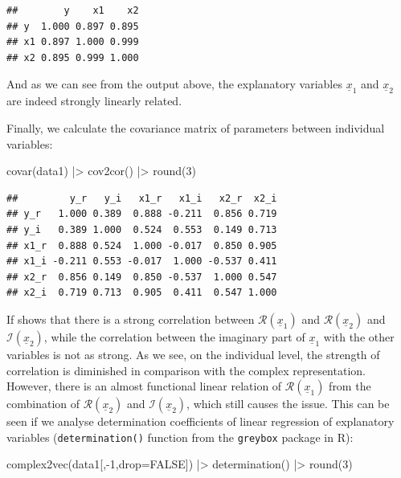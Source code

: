 \documentclass[
]{book}
\newenvironment{Shaded}{\begin{snugshade}}{\end{snugshade}}
\newcommand{\AttributeTok}[1]{\textcolor[rgb]{0.77,0.63,0.00}{#1}}
\newcommand{\ConstantTok}[1]{\textcolor[rgb]{0.00,0.00,0.00}{#1}}
\newcommand{\DecValTok}[1]{\textcolor[rgb]{0.00,0.00,0.81}{#1}}
\newcommand{\FunctionTok}[1]{\textcolor[rgb]{0.00,0.00,0.00}{#1}}
\newcommand{\NormalTok}[1]{#1}
\newcommand{\SpecialCharTok}[1]{\textcolor[rgb]{0.00,0.00,0.00}{#1}}
\begin{document}
\begin{verbatim}
##        y    x1    x2
## y  1.000 0.897 0.895
## x1 0.897 1.000 0.999
## x2 0.895 0.999 1.000
\end{verbatim}

And as we can see from the output above, the explanatory variables \(\underline{x}_{1}\) and \(\underline{x}_{2}\) are indeed strongly linearly related.

Finally, we calculate the covariance matrix of parameters between individual variables:

\begin{Shaded}
\begin{Highlighting}[]
\FunctionTok{covar}\NormalTok{(data1) }\SpecialCharTok{|\textgreater{}} \FunctionTok{cov2cor}\NormalTok{() }\SpecialCharTok{|\textgreater{}} \FunctionTok{round}\NormalTok{(}\DecValTok{3}\NormalTok{)}
\end{Highlighting}
\end{Shaded}

\begin{verbatim}
##         y_r   y_i   x1_r   x1_i   x2_r  x2_i
## y_r   1.000 0.389  0.888 -0.211  0.856 0.719
## y_i   0.389 1.000  0.524  0.553  0.149 0.713
## x1_r  0.888 0.524  1.000 -0.017  0.850 0.905
## x1_i -0.211 0.553 -0.017  1.000 -0.537 0.411
## x2_r  0.856 0.149  0.850 -0.537  1.000 0.547
## x2_i  0.719 0.713  0.905  0.411  0.547 1.000
\end{verbatim}

If shows that there is a strong correlation between \(\mathcal{R}\left(\underline{x}_{1}\right)\) and \(\mathcal{R}\left(\underline{x}_{2}\right)\) and \(\mathcal{I}\left(\underline{x}_{2}\right)\), while the correlation between the imaginary part of \(\underline{x}_{1}\) with the other variables is not as strong. As we see, on the individual level, the strength of correlation is diminished in comparison with the complex representation. However, there is an almost functional linear relation of \(\mathcal{R}\left(\underline{x}_{1}\right)\) from the combination of \(\mathcal{R}\left(\underline{x}_{2}\right)\) and \(\mathcal{I}\left(\underline{x}_{2}\right)\), which still causes the issue. This can be seen if we analyse determination coefficients of linear regression of explanatory variables (\texttt{determination()} function from the \texttt{greybox} package in R):

\begin{Shaded}
\begin{Highlighting}[]
\FunctionTok{complex2vec}\NormalTok{(data1[,}\SpecialCharTok{{-}}\DecValTok{1}\NormalTok{,}\AttributeTok{drop=}\ConstantTok{FALSE}\NormalTok{]) }\SpecialCharTok{|\textgreater{}}
    \FunctionTok{determination}\NormalTok{() }\SpecialCharTok{|\textgreater{}} \FunctionTok{round}\NormalTok{(}\DecValTok{3}\NormalTok{)}
\end{Highlighting}
\end{Shaded}
\end{document}
